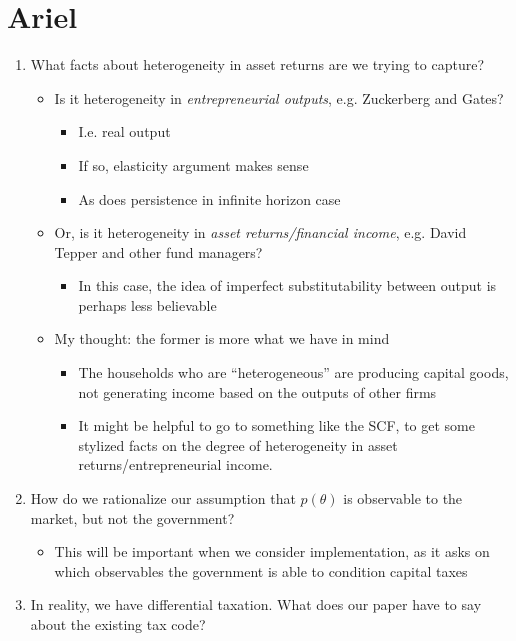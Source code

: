 \documentclass[11pt]{article}
\begin{document}
\section{Ariel}
\begin{enumerate}
    \item What facts about heterogeneity in asset returns are we trying to capture?
    \begin{itemize}
        \item Is it heterogeneity in \textit{entrepreneurial outputs}, e.g. Zuckerberg and Gates? 
        \begin{itemize}
            \item I.e. real output
            \item If so, elasticity argument makes sense
            \item As does persistence in infinite horizon case
        \end{itemize} 
        \item Or, is it heterogeneity in \textit{asset returns/financial income}, e.g. David Tepper and other fund managers? 
        \begin{itemize}
            \item In this case, the idea of imperfect substitutability between output is perhaps less believable 
        \end{itemize} 
        \item My thought: the former is more what we have in mind 
        \begin{itemize}
            \item The households who are ``heterogeneous'' are producing capital goods, not generating income based on the outputs of other firms 
            \item It might be helpful to go to something like the SCF, to get some stylized facts on the degree of heterogeneity in asset returns/entrepreneurial income. 
        \end{itemize}
    \end{itemize} 
    \item How do we rationalize our assumption that \( p(\theta) \) is observable to the market, but not the government? 
    \begin{itemize}
        \item This will be important when we consider implementation, as it asks on which observables the government is able to condition capital taxes 
    \end{itemize} 
    \item \label{it:diff} In reality, we have differential taxation. What does our paper have to say about the existing tax code? 

\end{enumerate}
\end{document}

